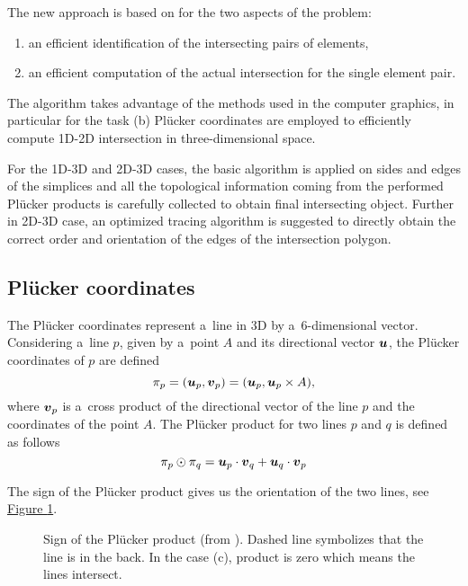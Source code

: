\documentclass[dvipsnames,FM,Dis]{tulthesis}
\newcommand{\fig}[1]{\hyperref[#1]{Figure \ref{#1}}}
\newcommand{\figpath}{figures/}
\begin{document}
The new approach is based on \cite{yuan_efficient_2003} for the two aspects of the problem: 
\begin{enumerate}[label=\alph*), itemsep=-3pt]
\item an efficient identification of the intersecting pairs of elements,
\item an efficient computation of the actual intersection for the single element pair.
\end{enumerate}
The algorithm takes advantage of the methods used in the computer graphics, in particular for the task (b) Pl\"{u}cker
coordinates are employed to efficiently compute 1D-2D intersection in three-dimensional space.

\begin{figure}[!htb]
  \centering
  \setcounter{subfigure}{0}
  \hspace{10pt}
\end{figure}
      
For the 1D-3D and 2D-3D cases, the basic algorithm is applied on sides and edges of the simplices and 
all the topological information coming from the performed Pl\"{u}cker products is carefully collected
to obtain final intersecting object.
Further in 2D-3D case, an optimized tracing algorithm is suggested to directly obtain the correct order and 
orientation of the edges of the intersection polygon.

\subsection{Pl\"{u}cker coordinates}
The Pl\"{u}cker coordinates represent a~line in 3D by a~6-dimensional vector.
Considering a~line $p$, given by a~point $A$ and its directional vector $\mathbf{\boldsymbol{u}}$, 
the Pl\"{u}cker coordinates of $p$ are defined
\[ \pi_p = (\mathbf{\boldsymbol{u}}_p, \mathbf{\boldsymbol{v}}_p) = (\mathbf{\boldsymbol{u}}_p, \mathbf{\boldsymbol{u}}_p\times A), \]
where $\mathbf{\boldsymbol{v}}_p$ is a~cross product of the directional vector of the line $p$ 
and the coordinates of the point $A$.
The Pl\"{u}cker product for two lines $p$ and $q$ is defined as follows 
\[\pi_p \odot \pi_q = \mathbf{\boldsymbol{u}}_p\cdot \mathbf{\boldsymbol{v}}_q + \mathbf{\boldsymbol{u}}_q \cdot \mathbf{\boldsymbol{v}}_p \]

The sign of the Pl\"{u}cker product gives us the orientation of the two lines, 
see \fig{fig:plucker_products}.

\begin{figure}[!htb]
  \begin{center}        
    \def\svgwidth{0.7\textwidth}
    
  \end{center}
  \caption{Sign of the Pl\"{u}cker product (from \cite{fris_dp_2015}). Dashed line symbolizes that the line 
           is in the back. In the case (c), product is zero which means the lines intersect.}
  \label{fig:plucker_products}
\end{figure}
\end{document}

